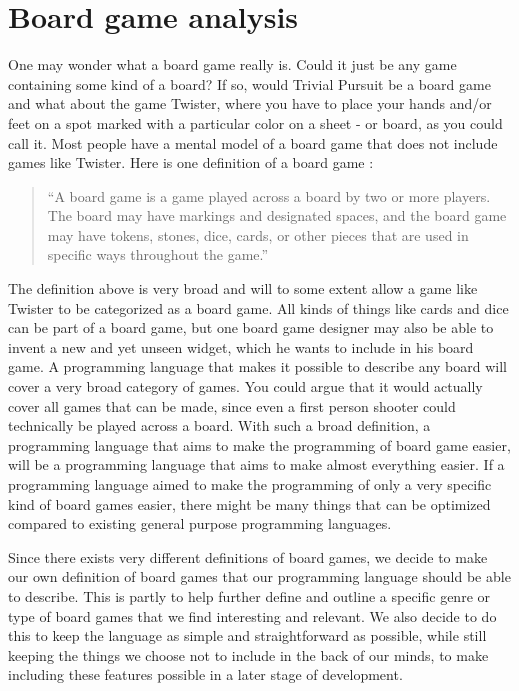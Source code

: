 \section{Board game analysis}
\label{sec:board-game-analysis}

One may wonder what a board game really is. Could it just be any game
containing some kind of a board? If so, would Trivial Pursuit be a board
game and what about the game Twister, where you have to place your hands
and/or feet on a spot marked with a particular color on a sheet - or
board, as you could call it. Most people have a mental model of a board
game that does not include games like Twister. Here is one definition of
a board game \cite{def-board-game}:

\begin{quote}
  ``A board game is a game played across a board by two or
  more players. The board may have markings and designated spaces, and the
  board game may have tokens, stones, dice, cards, or other pieces that
  are used in specific ways throughout the game.''
\end{quote}

The definition above is very broad and will to some extent allow a game
like Twister to be categorized as a board game. All kinds of things
like cards and dice can be part of a board game, but one board game
designer may also be able to invent a new and yet unseen widget, which
he wants to include in his board game. A programming language that makes
it possible to describe any board will cover a very broad category of
games. You could argue that it would actually cover all games that can
be made, since even a first person shooter could technically be played across a
board. With such a broad definition, a programming language that aims
to make the programming of board game easier, will be a programming
language that aims to make almost everything easier. If a programming
language aimed to make the programming of only a very specific kind of
board games easier, there might be many things that can be optimized
compared to existing general purpose programming languages.

Since there exists very different definitions of board games, we decide to make our own definition of board games that
our programming language should be able to describe. This is partly to
help further define and outline a specific genre or type of board games
that we find interesting and relevant. We also decide to do this to keep
the language as simple and straightforward as possible, while still
keeping the things we choose not to include in the back of our minds, to
make including these features possible in a later stage of development.

